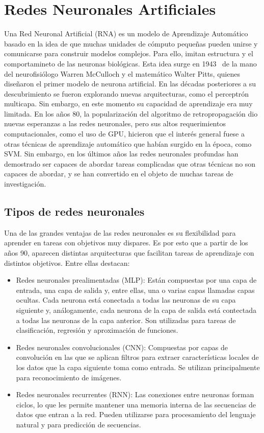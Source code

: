 \section{Redes Neuronales Artificiales}

 Una Red Neuronal Artificial (RNA) es un modelo de Aprendizaje Automático basado en la idea de que muchas unidades de cómputo pequeñas pueden unirse y comunicarse para construir modelos complejos. Para ello, imitan estructura y el comportamineto de las neuronas biológicas. Esta idea surge en 1943~\cite{mcculloch1943logical} de la mano del neurofisiólogo Warren McCulloch y el matemático Walter Pitts, quienes diseñaron el primer modelo de neurona artificial. En las décadas posteriores a su descubrimiento se fueron explorando nuevas arquitecturas, como el perceptrón multicapa. Sin embargo, en este momento su capacidad de aprendizaje era muy limitada. En los años 80, la popularización del algoritmo de retropropagación dio nuevas esperanzas a las redes neuronales, pero sus altos requerimientos computacionales, como el uso de GPU, hicieron que el interés general fuese a otras técnicas de aprendizaje automático que habían surgido en la época, como SVM. Sin embargo, en los últimos años las redes neuronales profundas han demostrado ser capaces de abordar tareas complicadas que otras técnicas no son capaces de abordar, y se han convertido en el objeto de muchas tareas de investigación.
 
\subsection{Tipos de redes neuronales}
Una de las grandes ventajas de las redes neuronales es su flexibilidad para aprender en tareas con objetivos muy dispares. Es por esto que a partir de los años 90, aparecen distintas arquitecturas que facilitan tareas de aprendizaje con distintos objetivos. Entre ellas destacan: 

\begin{itemize}
    \item Redes neuronales prealimentadas (MLP): Están compuestas por una capa de entrada, una capa de salida y, entre ellas, una o varias capas llamadas capas ocultas. Cada neurona está conectada a todas las neuronas de su capa siguiente y, análogamente, cada neurona de la capa de salida está contectada a todas las neuronas de la capa anterior. Son utilizadas para tareas de clasificación, regresión y aproximación de funciones. 
    \item Redes neuronales convolucionales (CNN): Compuestas por capas de convolución en las que se aplican filtros para extraer características locales de los datos que la capa siguiente toma como entrada. Se utilizan principalmente para reconocimiento de imágenes.  
    \item Redes neuronales recurrentes (RNN): Las conexiones entre neuronas forman ciclos, lo que les permite mantener una memoria interna de las secuencias de datos que entran a la red. Pueden utilizarse para procesamiento del lenguaje natural y para predicción de secuencias. 
\end{itemize}

